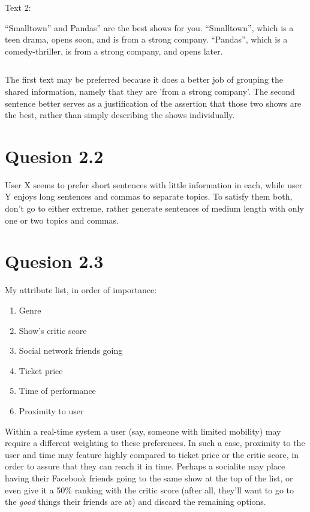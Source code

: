 \documentclass[a4paper,11pt,oneside]{article}
\begin{document}
Text 2:

“Smalltown” and Pandas” are the best shows for you. “Smalltown”, which is a teen drama, opens soon, and is from a strong company. “Pandas”, which is a comedy-thriller, is from a strong company, and opens later.
\begin{verbatim}

\end{verbatim}

The first text may be preferred because it does a better job of grouping the shared information, namely that they are 'from a strong company'. The second sentence better serves as a justification of the assertion that those two shows are the best, rather than simply describing the shows individually.

\section{Quesion 2.2}
User X seems to prefer short sentences with little information in each, while user Y enjoys long sentences and commas to separate topics. To satisfy them both, don't go to either extreme, rather generate sentences of medium length with only one or two topics and commas.

\section{Quesion 2.3}
My attribute list, in order of importance:
\begin{enumerate}
\item Genre
\item Show's critic score
\item Social network friends going
\item Ticket price
\item Time of performance
\item Proximity to user
\end{enumerate}

Within a real-time system a user (say, someone with limited mobility) may require a different weighting to these preferences. In such a case, proximity to the user and time may feature highly compared to ticket price or the critic score, in order to assure that they can reach it in time. Perhaps a socialite may place having their Facebook friends going to the same show at the top of the list, or even give it a 50\% ranking with the critic score (after all, they'll want to go to the \emph{good} things their friends are at) and discard the remaining options.
\end{document}
